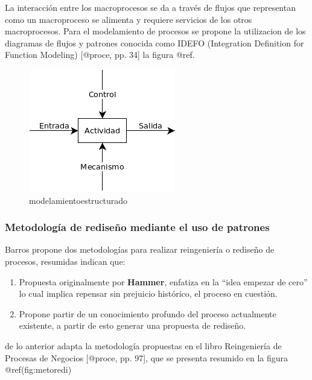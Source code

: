 \documentclass[
]{article}
\begin{document}
La interacción entre los macroprocesos se da a través de flujos que
representan como un macroproceso se alimenta y requiere servicios de los
otros macroprocesos. Para el modelamiento de procesos se propone la
utilizacion de los diagramas de flujos y patrones conocida como IDEFO
(Integration Definition for Function Modeling) {[}@proce, pp. 34{]} la
figura @ref.

\begin{figure}
\centering
\includegraphics{fig/modelamientoestructurado.png}
\caption{modelamientoestructurado}
\end{figure}

\hypertarget{metodologuxeda-de-rediseuxf1o-mediante-el-uso-de-patrones}{%
\subsubsection{Metodología de rediseño mediante el uso de
patrones}\label{metodologuxeda-de-rediseuxf1o-mediante-el-uso-de-patrones}}

Barros propone dos metodologías para realizar reingeniería o rediseño de
procesos, resumidas indican que:

\begin{enumerate}
\def\labelenumi{\arabic{enumi}.}
\item
  Propuesta originalmente por \textbf{Hammer}, enfatiza en la ``idea
  empezar de cero'' lo cual implica repensar sin prejuicio histórico, el
  proceso en cuestión.
\item
  Propone partir de un conocimiento profundo del proceso actualmente
  existente, a partir de esto generar una propuesta de rediseño.
\end{enumerate}

de lo anterior adapta la metodología propuestas en el libro Reingeniería
de Procesas de Negocios {[}@proce, pp. 97{]}, que se presenta resumido
en la figura @ref(fig:metoredi)
\end{document}

